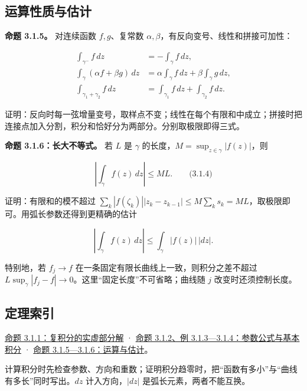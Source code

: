 \documentclass[11pt,a4paper]{article}
\begin{document}
\subsection{运算性质与估计}\label{ch03-s1-ux8fd0ux7b97ux6027ux8d28ux4e0eux4f30ux8ba1}

\textbf{命题 3.1.5。} 对连续函数 \(f,g\)、复常数
\(\alpha,\beta\)，有反向变号、线性和拼接可加性：

\[
\begin{aligned}
\int_{\gamma^-}f\,dz&=-\int_\gamma f\,dz,\\
\int_\gamma(\alpha f+\beta g)\,dz
&=\alpha\int_\gamma f\,dz+\beta\int_\gamma g\,dz,\\
\int_{\gamma_1+\gamma_2}f\,dz
&=\int_{\gamma_1}f\,dz+\int_{\gamma_2}f\,dz.
\end{aligned}
\]

证明：反向时每一弦增量变号，取样点不变；线性在每个有限和中成立；拼接时把连接点加入分割，积分和恰好分为两部分。分别取极限即得三式。

\textbf{命题 3.1.6：长大不等式。} 若 \(L\) 是 \(\gamma\)
的长度，\(M=\sup_{z\in\gamma}|f(z)|\)，则

\[
\left|\int_\gamma f(z)\,dz\right|\le ML.
\qquad\text{(3.1.4)}
\]

证明：有限和的模不超过
\(\sum_k|f(\zeta_k)||z_k-z_{k-1}|\le M\sum_k s_k=ML\)，取极限即可。用弧长参数还得到更精确的估计

\[
\left|\int_\gamma f(z)\,dz\right|
\le\int_\gamma|f(z)|\,|dz|.
\]

特别地，若 \(f_j\to f\) 在一条固定有限长曲线上一致，则积分之差不超过
\(L\sup_\gamma|f_j-f|\to0\)。这里``固定长度''不可省略；曲线随 \(j\)
改变时还须控制长度。

\subsection{定理索引}\label{ch03-s1-ux5b9aux7406ux7d22ux5f15}

\hyperref[ch03-s1-ux53efux6c42ux957fux66f2ux7ebfux4e0aux7684ux5b9aux4e49]{命题
3.1.1：复积分的实虚部分解} ·
\hyperref[ch03-s1-ux53c2ux6570ux8ba1ux7b97ux4e0eux57faux672cux4f8bux5b50]{命题
3.1.2、例 3.1.3---3.1.4：参数公式与基本积分} ·
\hyperref[ch03-s1-ux8fd0ux7b97ux6027ux8d28ux4e0eux4f30ux8ba1]{命题
3.1.5---3.1.6：运算与估计}。

计算积分时先检查参数、方向和重数；证明积分趋零时，把``函数有多小''与``曲线有多长''同时写出。\(dz\)
计入方向，\(|dz|\) 是弧长元素，两者不能互换。
\end{document}
